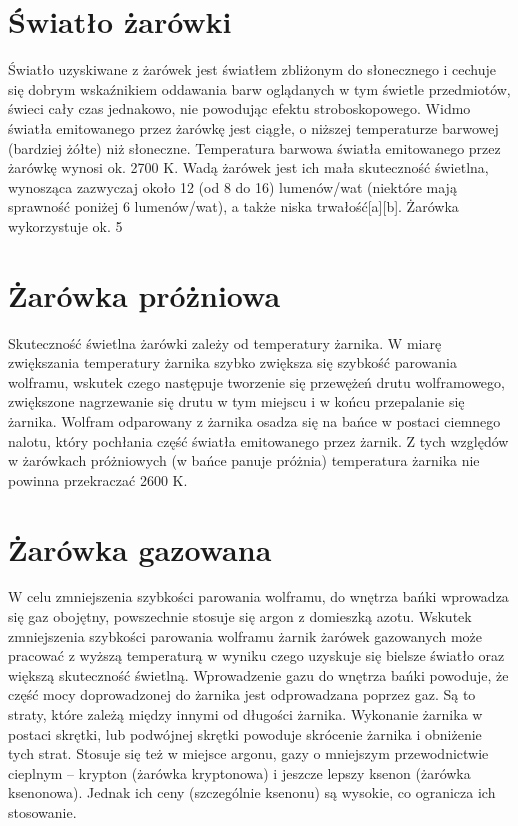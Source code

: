\documentclass[12pt,a4paper]{book}
\begin{document}
\section*{Światło żarówki}

Światło uzyskiwane z żarówek jest światłem zbliżonym do słonecznego i cechuje się dobrym wskaźnikiem oddawania barw oglądanych w tym świetle przedmiotów, świeci cały czas jednakowo, nie powodując efektu stroboskopowego. Widmo światła emitowanego przez żarówkę jest ciągłe, o niższej temperaturze barwowej (bardziej żółte) niż słoneczne. Temperatura barwowa światła emitowanego przez żarówkę wynosi ok. 2700 K. Wadą żarówek jest ich mała skuteczność świetlna, wynosząca zazwyczaj około 12 (od 8 do 16) lumenów/wat (niektóre mają sprawność poniżej 6 lumenów/wat), a także niska trwałość[a][b]. Żarówka wykorzystuje ok. 5%

\section*{Żarówka próżniowa}

Skuteczność świetlna żarówki zależy od temperatury żarnika. W miarę zwiększania temperatury żarnika szybko zwiększa się szybkość parowania wolframu, wskutek czego następuje tworzenie się przewężeń drutu wolframowego, zwiększone nagrzewanie się drutu w tym miejscu i w końcu przepalanie się żarnika. Wolfram odparowany z żarnika osadza się na bańce w postaci ciemnego nalotu, który pochłania część światła emitowanego przez żarnik. Z tych względów w żarówkach próżniowych (w bańce panuje próżnia) temperatura żarnika nie powinna przekraczać 2600 K.

\section*{Żarówka gazowana}

W celu zmniejszenia szybkości parowania wolframu, do wnętrza bańki wprowadza się gaz obojętny, powszechnie stosuje się argon z domieszką azotu. Wskutek zmniejszenia szybkości parowania wolframu żarnik żarówek gazowanych może pracować z wyższą temperaturą w wyniku czego uzyskuje się bielsze światło oraz większą skuteczność świetlną. Wprowadzenie gazu do wnętrza bańki powoduje, że część mocy doprowadzonej do żarnika jest odprowadzana poprzez gaz. Są to straty, które zależą między innymi od długości żarnika. Wykonanie żarnika w postaci skrętki, lub podwójnej skrętki powoduje skrócenie żarnika i obniżenie tych strat. Stosuje się też w miejsce argonu, gazy o mniejszym przewodnictwie cieplnym – krypton (żarówka kryptonowa) i jeszcze lepszy ksenon (żarówka ksenonowa). Jednak ich ceny (szczególnie ksenonu) są wysokie, co ogranicza ich stosowanie.
\end{document}
